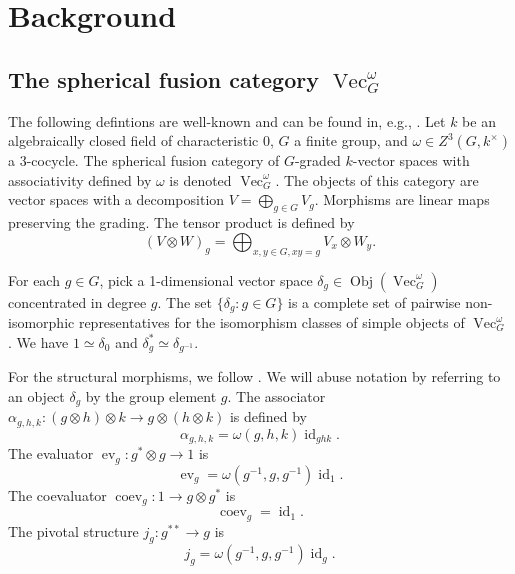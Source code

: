 \documentclass{amsart}
\DeclareMathOperator{\id}{id}
\DeclareMathOperator{\Vect}{Vec}
\DeclareMathOperator{\Obj}{Obj}
\DeclareMathOperator{\coev}{coev}
\DeclareMathOperator{\ev}{ev}
\newcommand{\one}{1}
\begin{document}
\section{Background}
\subsection{The spherical fusion category $\Vect_G^\omega$}
The following defintions are well-known and can be found in, e.g., \cite{etingofTensor}.  Let $k$ be an  algebraically closed field of characteristic 0,  $G$ a finite group, and $\omega \in Z^3(G, k^\times)$ a 3-cocycle.    The spherical fusion category of $G$-graded $k$-vector spaces with associativity defined by $\omega$ is denoted $\Vect_G^\omega$.  The objects of this category are vector spaces with a decomposition $V = \bigoplus_{g \in G} V_g$. Morphisms are linear maps preserving the grading. The tensor product is defined by
$$ (V \otimes W)_g = \bigoplus_{x,y \in G, xy = g} V_x \otimes W_y. $$


For each $g \in G$, pick a 1-dimensional vector space $\delta_g \in \Obj(\Vect_G^\omega)$ concentrated in degree $g$.  The set $\{\delta_g : g \in G\}$ is a complete set of pairwise non-isomorphic representatives for the isomorphism classes of simple objects of $\Vect_G^\omega$.  We have $\one \simeq \delta_0$ and $\delta_g^* \simeq \delta_{g^{-1}}$.

For the structural morphisms,  we follow \cite{math/0601012}.  We will abuse notation by referring to an object $\delta_g$ by the group element $g$.  The associator $\alpha_{g,h,k}:(g \otimes h) \otimes k \to g \otimes (h \otimes k)$ is defined by
$$\alpha_{g,h,k} = \omega(g,h,k) \id_{{ghk}}.$$ 
The evaluator $\ev_g:g^* \otimes g \to 1$ is 
$$\ev_{g} = \omega(g^{-1},g,g^{-1}) \id_1.$$  
The coevaluator $\coev_g:1 \to g \otimes g^*$ is 
$$\coev_{g} = \id_1.$$ 
The pivotal structure $j_g:g^{**} \to g$ is 
$$j_{g} = \omega(g^{-1},g,g^{-1}) \id_{g}.$$

\newcommand{\ee}{\mathbf{e}}       %
\newcommand{\A}{\mathcal{A}}      %
\newcommand{\st}{\; | \;}                               %
\newcommand{\ttt}{\otimes}                              %
\newcommand{\cc}[1]{\underset{\scriptstyle #1}{\circ}}
\newcommand{\ccc}[1]{\underset{\scriptstyle #1}{\bullet}}
\newcommand{\ti}{\tilde}
\newcommand{\ov}{\overline}
\newcommand{\del}{\partial}
\newcommand{\<}{\langle}
\renewcommand{\>}{\rangle}
\newcommand{\surjto}{\twoheadrightarrow}      %
\newcommand{\injto}{\hookrightarrow}          %
\newcommand{\isoto}{\xrightarrow{\sim}}       %
\newcommand{\xxto}{\xrightarrow}              %
\newcommand{\firef}[1]{Figure~{\rm\ref{#1}}}
\newcommand{\R}{\mathbb{R}}       %
\end{document}
